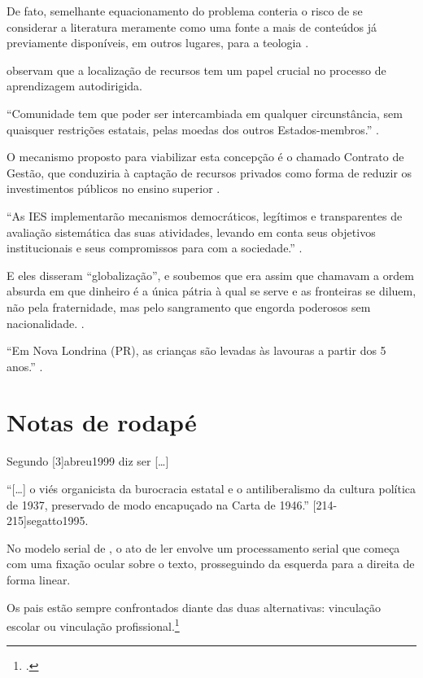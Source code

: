 \documentclass[a4paper]{article}
\begin{document}
De fato, semelhante equacionamento do problema conteria o risco de se
considerar a literatura meramente como uma fonte a mais de conteúdos já
previamente disponíveis, em outros lugares, para a teologia
\cite[3]{jossua1976}.

\textcite{merriam1991} observam que a localização de recursos tem um papel
crucial no processo de aprendizagem autodirigida.

\enquote{Comunidade tem que poder ser intercambiada em qualquer circunstância,
sem quaisquer restrições estatais, pelas moedas dos outros Estados-membros.}
\cite[34]{comissao1992}.

O mecanismo proposto para viabilizar esta concepção é o chamado Contrato de
Gestão, que conduziria à captação de recursos privados como forma de reduzir
os investimentos públicos no ensino superior \cite{brasil1995}.

\enquote{As IES implementarão mecanismos democráticos, legítimos
e transparentes de avaliação sistemática das suas atividades, levando em conta
seus objetivos institucionais e seus compromissos para com a sociedade.}
\cite[55]{anteprojeto1987}.

E eles disseram \enquote{globalização}, e soubemos que era assim que chamavam
a ordem absurda em que dinheiro é a única pátria à qual se serve e as
fronteiras se diluem, não pela fraternidade, mas pelo sangramento que engorda
poderosos sem nacionalidade. \cite[4]{aflor1995}.

\enquote{Em Nova Londrina (PR), as crianças são levadas às lavouras a partir
dos 5 anos.} \cite[12]{noscanaviais1995}.


\section{Notas de rodapé}

Segundo [3]{abreu1999} diz ser [\ldots]

\enquote{[\ldots] o viés organicista da burocracia estatal e o antiliberalismo
da cultura política de 1937, preservado de modo encapuçado na Carta de 1946.}
[214-215]{segatto1995}.

No modelo serial de , o ato de ler envolve um
processamento serial que começa com uma fixação ocular sobre o texto,
prosseguindo da esquerda para a direita de forma linear.

\setcounter{footnote}{3}
Os pais estão sempre confrontados diante das duas alternativas: vinculação
escolar ou vinculação profissional.\footcite[Sobre essa opção dramática, ver
também][269--290]{morice1996}
\end{document}
